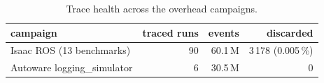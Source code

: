 \begin{table}[t]\centering\small
\caption{Trace health across the overhead campaigns.}\label{tab:trace-health}
\begin{tabular}{lrrr}
\toprule
campaign & traced runs & events & discarded \\
\midrule
Isaac ROS (13 benchmarks) & 90 & 60.1\,M & 3\,178 (0.005\,\%) \\
Autoware logging\_simulator & 6 & 30.5\,M & 0 \\
\bottomrule
\end{tabular}
\end{table}
